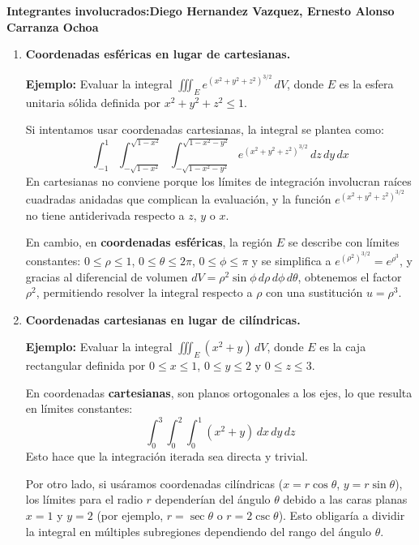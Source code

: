 \begin{respuesta}
    \textbf{Integrantes involucrados:Diego Hernandez Vazquez, Ernesto Alonso Carranza Ochoa}


    \begin{enumerate}
    \item[(a)] \textbf{Coordenadas esféricas en lugar de cartesianas.}
    
    \textbf{Ejemplo:} Evaluar la integral $\iiint_E e^{(x^2+y^2+z^2)^{3/2}} \, dV$, donde $E$ es la esfera unitaria sólida definida por $x^2+y^2+z^2 \leq 1$.
    
    
    Si intentamos usar coordenadas cartesianas, la integral se plantea como:
    \[ \int_{-1}^{1} \int_{-\sqrt{1-x^2}}^{\sqrt{1-x^2}} \int_{-\sqrt{1-x^2-y^2}}^{\sqrt{1-x^2-y^2}} e^{(x^2+y^2+z^2)^{3/2}} \, dz \, dy \, dx \]
    En cartesianas no conviene porque los límites de integración involucran raíces cuadradas anidadas que complican la evaluación, y la función $e^{(x^2+y^2+z^2)^{3/2}}$ no tiene antiderivada respecto a $z$, $y$ o $x$. 
    
    En cambio, en \textbf{coordenadas esféricas}, la región $E$ se describe con límites constantes: $0 \leq \rho \leq 1$, $0 \leq \theta \leq 2\pi$, $0 \leq \phi \leq \pi$ y se simplifica a $e^{(\rho^2)^{3/2}} = e^{\rho^3}$, y gracias al diferencial de volumen $dV = \rho^2 \sin\phi \, d\rho \, d\phi \, d\theta$, obtenemos el factor $\rho^2$, permitiendo resolver la integral respecto a $\rho$ con una sustitución $u = \rho^3$.

    \item[(b)] \textbf{Coordenadas cartesianas en lugar de cilíndricas.}
    
    \textbf{Ejemplo:} Evaluar la integral $\iiint_E (x^2 + y) \, dV$, donde $E$ es la caja rectangular definida por $0 \leq x \leq 1$, $0 \leq y \leq 2$ y $0 \leq z \leq 3$.
    
    En coordenadas \textbf{cartesianas}, son planos ortogonales a los ejes, lo que resulta en límites constantes:
    \[ \int_{0}^{3} \int_{0}^{2} \int_{0}^{1} (x^2 + y) \, dx \, dy \, dz \]
    Esto hace que la integración iterada sea directa y trivial.
    
    Por otro lado, si usáramos coordenadas cilíndricas ($x = r\cos\theta$, $y = r\sin\theta$), los límites para el radio $r$ dependerían del ángulo $\theta$ debido a las caras planas $x=1$ y $y=2$ (por ejemplo, $r = \sec\theta$ o $r = 2\csc\theta$). Esto obligaría a dividir la integral en múltiples subregiones dependiendo del rango del ángulo $\theta$.


\end{enumerate}
\end{respuesta}
